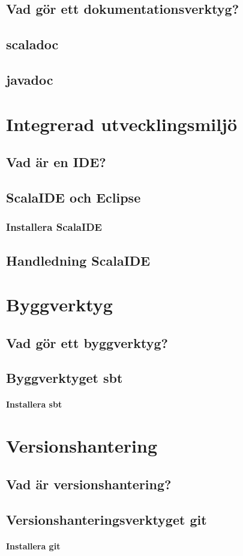 \documentclass[a4paper]{compendium}
\begin{document}
\section{Vad gör ett dokumentationsverktyg?}
\section{scaladoc}
\section{javadoc}

\chapter{Integrerad utvecklingsmiljö}
\section{Vad är en IDE?}
\section{ScalaIDE och Eclipse}
\subsection{Installera ScalaIDE}
\section{Handledning ScalaIDE}

\chapter{Byggverktyg}
\section{Vad gör ett byggverktyg?}
\section{Byggverktyget sbt}
\subsubsection{Installera sbt}

\chapter{Versionshantering}
\section{Vad är versionshantering?}
\section{Versionshanteringsverktyget git}
\subsubsection{Installera git}
\end{document}
